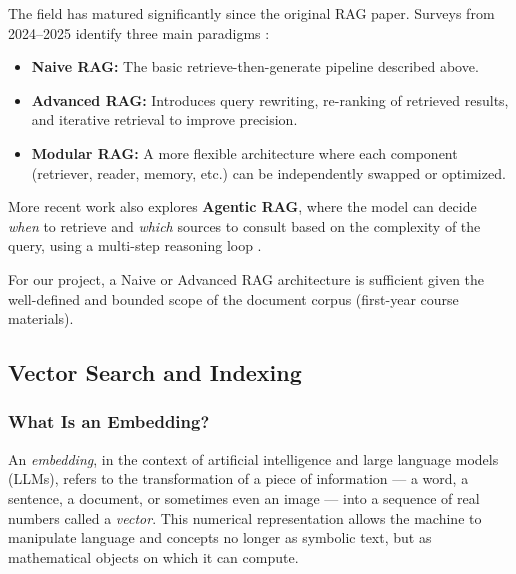 \documentclass[a4paper,11pt]{article}
\begin{document}
The field has matured significantly since the original RAG paper. Surveys
from 2024--2025 identify three main paradigms \cite{gao2024rag}:
 
\begin{itemize}
  \item \textbf{Naive RAG:} The basic retrieve-then-generate pipeline
    described above.
  \item \textbf{Advanced RAG:} Introduces query rewriting, re-ranking of
    retrieved results, and iterative retrieval to improve precision.
  \item \textbf{Modular RAG:} A more flexible architecture where each
    component (retriever, reader, memory, etc.) can be independently swapped
    or optimized.
\end{itemize}
 
More recent work also explores \textbf{Agentic RAG}, where the model can
decide \emph{when} to retrieve and \emph{which} sources to consult based on
the complexity of the query, using a multi-step reasoning loop
\cite{zhao2024rag}.
 
For our project, a Naive or Advanced RAG architecture is sufficient given
the well-defined and bounded scope of the document corpus (first-year course
materials).

\subsection{Vector Search and Indexing}

\subsubsection{What Is an Embedding?}

An \emph{embedding}, in the context of artificial intelligence and large
language models (LLMs), refers to the transformation of a piece of
information --- a word, a sentence, a document, or sometimes even an image
--- into a sequence of real numbers called a \emph{vector}. This numerical
representation allows the machine to manipulate language and concepts no
longer as symbolic text, but as mathematical objects on which it can
compute.
\end{document}
